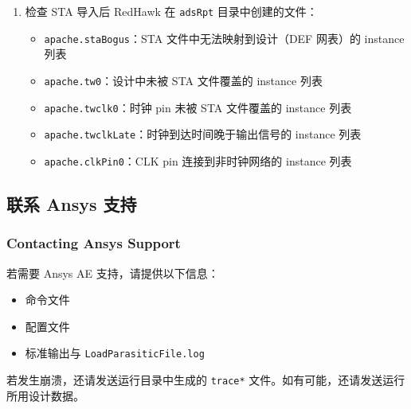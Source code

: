 \begin{enumerate}
\begin{lstlisting}
        clock = 867 (active 867)(quiet 0)
        non-clock = 38018 (active 34580)(quiet 3438)
\end{lstlisting}
  \item 检查 STA 导入后 RedHawk 在 \texttt{adsRpt} 目录中创建的文件：
  \begin{itemize}
    \item \texttt{apache.staBogus}：STA 文件中无法映射到设计（DEF 网表）的 instance 列表
    \item \texttt{apache.tw0}：设计中未被 STA 文件覆盖的 instance 列表
    \item \texttt{apache.twclk0}：时钟 pin 未被 STA 文件覆盖的 instance 列表
    \item \texttt{apache.twclkLate}：时钟到达时间晚于输出信号的 instance 列表
    \item \texttt{apache.clkPin0}：CLK pin 连接到非时钟网络的 instance 列表
  \end{itemize}
\end{enumerate}

\subsection{联系 Ansys 支持}
\subsubsection*{Contacting Ansys Support}

若需要 Ansys AE 支持，请提供以下信息：
\begin{itemize}
  \item 命令文件
  \item 配置文件
  \item 标准输出与 \texttt{LoadParasiticFile.log}
\end{itemize}

若发生崩溃，还请发送运行目录中生成的 \texttt{trace*} 文件。如有可能，还请发送运行所用设计数据。
